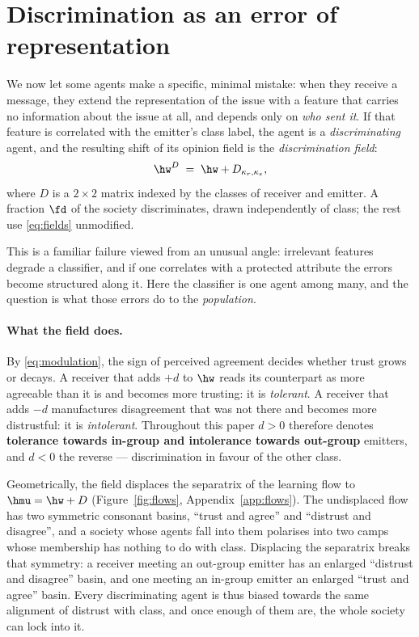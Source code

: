 \section{Discrimination as an error of representation}
\label{sec:discrimination}

We now let some agents make a specific, minimal mistake: when they receive a message, they extend the
representation of the issue with a feature that carries no information about the
issue at all, and depends only on \emph{who sent it}. If that feature is
correlated with the emitter's class label, the agent is a
\emph{discriminating} agent, and the resulting shift of its opinion field is the
\emph{discrimination field}:
%
\begin{equation}
  \hw^{D} \;=\; \hw + D_{\kappa_r,\kappa_e},
  \label{eq:disc-field}
\end{equation}
%
where $D$ is a $2\times2$ matrix indexed by the classes of receiver and emitter.
A fraction $\fd$ of the society discriminates, drawn independently of class; the
rest use \eqref{eq:fields} unmodified.

This is a familiar failure viewed from an unusual angle: irrelevant features degrade
a classifier, and if one correlates with a protected attribute the errors become
structured along it. Here the classifier is one agent among many, and the question is
what those errors do to the \emph{population}.

\paragraph{What the field does.} By \eqref{eq:modulation}, the sign of perceived
agreement decides whether trust grows or decays. A receiver that adds $+d$ to
$\hw$ reads its counterpart as more agreeable than it is and becomes more
trusting: it is \emph{tolerant}. A receiver that adds $-d$ manufactures
disagreement that was not there and becomes more distrustful: it is
\emph{intolerant}. Throughout this paper $d>0$ therefore denotes
\textbf{tolerance towards in-group and intolerance towards out-group} emitters,
and $d<0$ the reverse --- discrimination in favour of the other class.

Geometrically, the field displaces the separatrix of the learning flow to
$\hmu = \hw + D$ (Figure~\ref{fig:flows}, Appendix~\ref{app:flows}). The undisplaced flow has two
symmetric consonant basins, ``trust and agree'' and ``distrust and disagree'',
and a society whose agents fall into them polarises into two camps whose
membership has nothing to do with class. Displacing the separatrix breaks that
symmetry: a receiver meeting an out-group emitter has an enlarged
``distrust and disagree'' basin, and one meeting an in-group emitter an enlarged
``trust and agree'' basin. Every discriminating agent is thus biased towards the
same alignment of distrust with class, and once enough of them are, the whole
society can lock into it.



